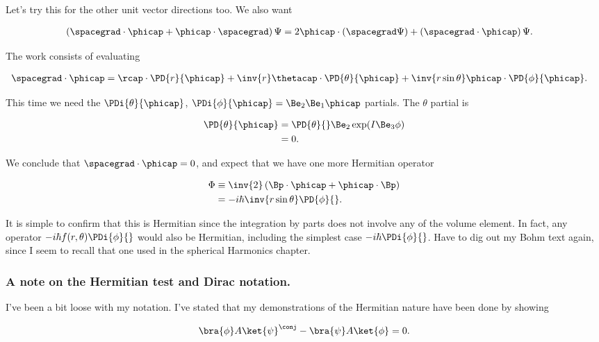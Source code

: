 Let's try this for the other unit vector directions too.  We also want

\begin{align*}
\left( \spacegrad \cdot \phicap + \phicap \cdot \spacegrad \right) \Psi
&=
2 \phicap \cdot (\spacegrad \Psi) + \left( \spacegrad \cdot \phicap \right) \Psi.
\end{align*}

The work consists of evaluating

\begin{align*}
\spacegrad \cdot \phicap 
&= \rcap \cdot \PD{r}{\phicap}
+ \inv{r} \thetacap \cdot \PD{\theta}{\phicap}
+ \inv{r \sin\theta} \phicap \cdot \PD{\phi}{\phicap}.
\end{align*}

This time we need the $\PDi{\theta}{\phicap}$, $\PDi{\phi}{\phicap} = \Be_2 \Be_1 \phicap$ partials.  The $\theta$ partial is

\begin{align*}
\PD{\theta}{\phicap} 
&=
\PD{\theta}{} \Be_2 \exp( I \Be_3 \phi ) \\
&= 0.
\end{align*}

We conclude that $\spacegrad \cdot \phicap = 0$, and expect that we have one more Hermitian operator

\begin{align*}
\Phi &\equiv \inv{2} \left( \Bp \cdot \phicap + \phicap \cdot \Bp \right)  \\
&=
-i \hbar \inv{r \sin\theta} \PD{\phi}{}.
\end{align*}

It is simple to confirm that this is Hermitian since the integration by parts does not involve any of the volume element.  In fact, any operator $-i\hbar f(r,\theta) \PDi{\phi}{}$ would also be Hermitian, including the simplest case $-i\hbar \PDi{\phi}{}$.  Have to dig out my Bohm text again, since I seem to recall that one used in the spherical Harmonics chapter.

\subsubsection{A note on the Hermitian test and Dirac notation.}

I've been a bit loose with my notation.  I've stated that my demonstrations of the Hermitian nature have been done by showing

\begin{align*}
\bra{\phi} A \ket{\psi}^\conj - \bra{\psi} A \ket{\phi} = 0.
\end{align*}

